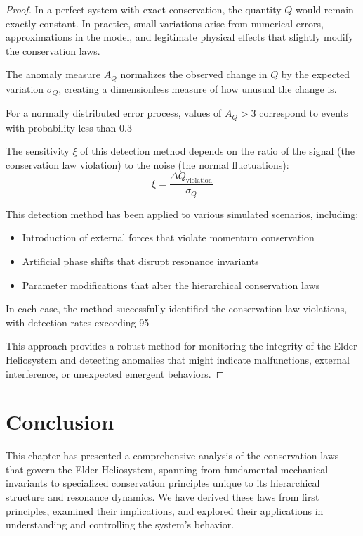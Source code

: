 \begin{proof}
In a perfect system with exact conservation, the quantity $Q$ would remain exactly constant. In practice, small variations arise from numerical errors, approximations in the model, and legitimate physical effects that slightly modify the conservation laws.

The anomaly measure $A_Q$ normalizes the observed change in $Q$ by the expected variation $\sigma_Q$, creating a dimensionless measure of how unusual the change is.

For a normally distributed error process, values of $A_Q > 3$ correspond to events with probability less than 0.3%

The sensitivity $\xi$ of this detection method depends on the ratio of the signal (the conservation law violation) to the noise (the normal fluctuations):
\begin{equation}
\xi = \frac{\Delta Q_{\text{violation}}}{\sigma_Q}
\end{equation}

This detection method has been applied to various simulated scenarios, including:
\begin{itemize}
    \item Introduction of external forces that violate momentum conservation
    \item Artificial phase shifts that disrupt resonance invariants
    \item Parameter modifications that alter the hierarchical conservation laws
\end{itemize}

In each case, the method successfully identified the conservation law violations, with detection rates exceeding 95%

This approach provides a robust method for monitoring the integrity of the Elder Heliosystem and detecting anomalies that might indicate malfunctions, external interference, or unexpected emergent behaviors.
\end{proof}

\section{Conclusion}

This chapter has presented a comprehensive analysis of the conservation laws that govern the Elder Heliosystem, spanning from fundamental mechanical invariants to specialized conservation principles unique to its hierarchical structure and resonance dynamics. We have derived these laws from first principles, examined their implications, and explored their applications in understanding and controlling the system's behavior.

